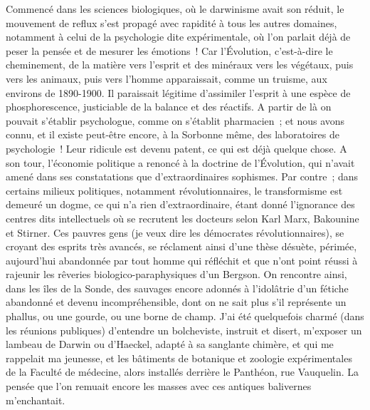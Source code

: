 \documentclass[french,twoside]{book} %
\begin{document}
Commencé dans les sciences biologiques, où le darwinisme avait son réduit, le mouvement de reflux s’est propagé avec rapidité à tous les autres domaines, notamment à celui de la psychologie dite expérimentale, où l’on parlait déjà de peser la pensée et de mesurer les émotions ! Car l’Évolution, c’est-à-dire le cheminement, de la matière vers l’esprit et des minéraux vers les végétaux, puis vers les animaux, puis vers l’homme apparaissait, comme un truisme, aux environs de 1890-1900. Il paraissait légitime d’assimiler l’esprit à une espèce de phosphorescence, justiciable de la balance et des réactifs. A partir de là on pouvait s’établir psychologue, comme on s’établit pharmacien ; et nous avons connu, et il existe peut-être encore, à la Sorbonne même, des laboratoires de psychologie ! Leur ridicule est devenu patent, ce qui est déjà quelque chose. A son tour, l’économie politique a renoncé à la doctrine de l’Évolution, qui n’avait amené dans ses constatations que d’extraordinaires sophismes. Par contre ; dans certains milieux politiques, notamment révolutionnaires, le transformisme est demeuré un dogme, ce qui n’a rien d’extraordinaire, étant donné l’ignorance des centres dits intellectuels où se recrutent les docteurs selon Karl Marx, Bakounine et Stirner. Ces pauvres gens (je veux dire les démocrates révolutionnaires), se croyant des esprits très avancés, se réclament ainsi d’une thèse désuète, périmée, aujourd’hui abandonnée par tout homme qui réfléchit et que n’ont point réussi à rajeunir les rêveries biologico-paraphysiques d’un Bergson. On rencontre ainsi, dans les îles de la Sonde, des sauvages encore adonnés à l’idolâtrie d’un fétiche abandonné et devenu incompréhensible, dont on ne sait plus s’il représente un phallus, ou une gourde, ou une borne de champ. J’ai été quelquefois charmé (dans les réunions publiques) d’entendre un bolcheviste, instruit et disert, m’exposer un lambeau de Darwin ou d’Haeckel, adapté à sa sanglante chimère, et qui me rappelait ma jeunesse, et les bâtiments de botanique et zoologie expérimentales de la Faculté de médecine, alors installés derrière le Panthéon, rue Vauquelin. La pensée que l’on remuait encore les masses avec ces antiques balivernes m’enchantait.\par
\end{document}
